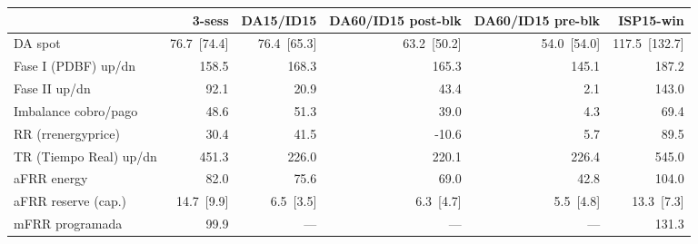 \begin{tabular}{lrrrrr}
\toprule
 & 3-sess & DA15/ID15 & DA60/ID15 post-blk & DA60/ID15 pre-blk & ISP15-win \\
\midrule
DA spot & 76.7~{\color{seasoncol}\scriptsize[74.4]} & 76.4~{\color{seasoncol}\scriptsize[65.3]} & 63.2~{\color{seasoncol}\scriptsize[50.2]} & 54.0~{\color{seasoncol}\scriptsize[54.0]} & 117.5~{\color{seasoncol}\scriptsize[132.7]} \\
Fase I (PDBF) up/dn & 158.5 & 168.3 & 165.3 & 145.1 & 187.2 \\
Fase II up/dn & 92.1 & 20.9 & 43.4 & 2.1 & 143.0 \\
Imbalance cobro/pago & 48.6 & 51.3 & 39.0 & 4.3 & 69.4 \\
RR (rrenergyprice) & 30.4 & 41.5 & -10.6 & 5.7 & 89.5 \\
TR (Tiempo Real) up/dn & 451.3 & 226.0 & 220.1 & 226.4 & 545.0 \\
aFRR energy & 82.0 & 75.6 & 69.0 & 42.8 & 104.0 \\
aFRR reserve (cap.) & 14.7~{\color{seasoncol}\scriptsize[9.9]} & 6.5~{\color{seasoncol}\scriptsize[3.5]} & 6.3~{\color{seasoncol}\scriptsize[4.7]} & 5.5~{\color{seasoncol}\scriptsize[4.8]} & 13.3~{\color{seasoncol}\scriptsize[7.3]} \\
mFRR programada & 99.9 & --- & --- & --- & 131.3 \\
\bottomrule
\end{tabular}
